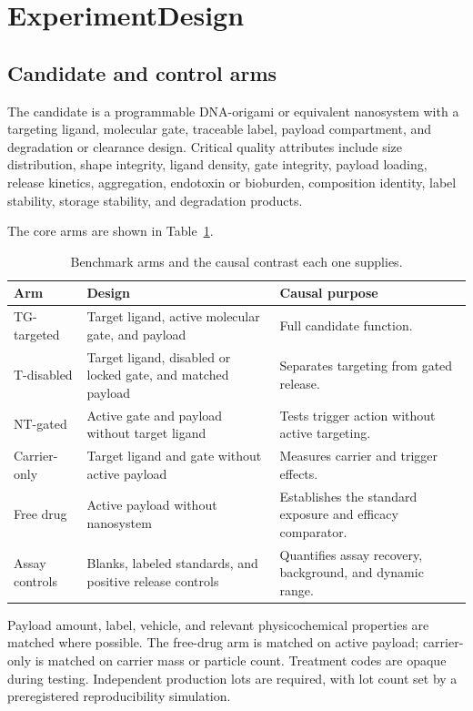 \documentclass[conference]{IEEEtran}
\begin{document}
\section{ExperimentDesign}
\label{sec:design}
\subsection{Candidate and control arms}
The candidate is a programmable DNA-origami or equivalent nanosystem with a targeting ligand, molecular gate, traceable label, payload compartment, and degradation or clearance design. Critical quality attributes include size distribution, shape integrity, ligand density, gate integrity, payload loading, release kinetics, aggregation, endotoxin or bioburden, composition identity, label stability, storage stability, and degradation products.

The core arms are shown in Table~\ref{tab:arms}.

\begin{table}[t]
\centering
\caption{Benchmark arms and the causal contrast each one supplies.}
\label{tab:arms}
\setlength{\tabcolsep}{4pt}
\begin{tabular}{>{\raggedright\arraybackslash}p{}>{\raggedright\arraybackslash}p{}>{\raggedright\arraybackslash}p{}}
\toprule
Arm & Design & Causal purpose \\
\midrule
TG-targeted & Target ligand, active molecular gate, and payload & Full candidate function. \\
T-disabled & Target ligand, disabled or locked gate, and matched payload & Separates targeting from gated release. \\
NT-gated & Active gate and payload without target ligand & Tests trigger action without active targeting. \\
Carrier-only & Target ligand and gate without active payload & Measures carrier and trigger effects. \\
Free drug & Active payload without nanosystem & Establishes the standard exposure and efficacy comparator. \\
Assay controls & Blanks, labeled standards, and positive release controls & Quantifies assay recovery, background, and dynamic range. \\
\bottomrule
\end{tabular}
\end{table}

Payload amount, label, vehicle, and relevant physicochemical properties are matched where possible. The free-drug arm is matched on active payload; carrier-only is matched on carrier mass or particle count. Treatment codes are opaque during testing. Independent production lots are required, with lot count set by a preregistered reproducibility simulation.
\end{document}
